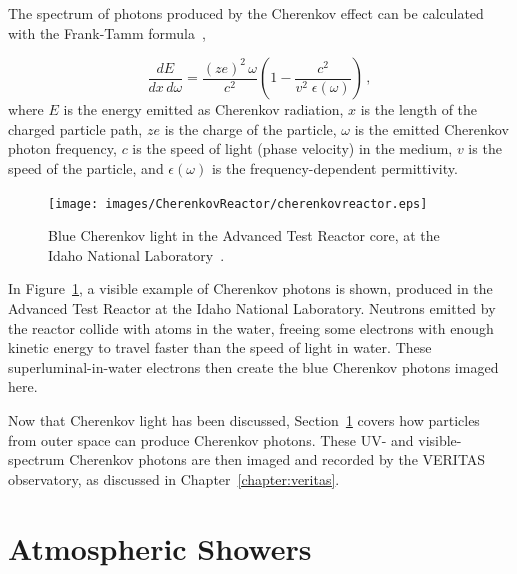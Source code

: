   The spectrum of photons produced by the Cherenkov effect can be calculated with the Frank-Tamm formula~\cite{franktamm1,franktamm2},
  
  \begin{equation}\label{eqn:franktamm}
    \frac{dE}{dx\,d\omega}=\frac{(ze)^2 \, \omega}{c^2} \left ( 1 - \frac{c^2}{v^2 \;\epsilon(\omega)} \right ) \,,
  \end{equation}
  where $E$ is the energy emitted as Cherenkov radiation, $x$ is the length of the charged particle path, $ze$ is the charge of the particle, $\omega$ is the emitted Cherenkov photon frequency, $c$ is the speed of light (phase velocity) in the medium, $v$ is the speed of the particle, and $\epsilon(\omega)$ is the frequency-dependent permittivity.
  
  \begin{figure}[!t]
    \centering
    \texttt{[image: images/CherenkovReactor/cherenkovreactor.eps]}
    \caption[Cherenkov Light from a Reactor]{
      Blue Cherenkov light in the Advanced Test Reactor core, at the Idaho National Laboratory~\cite{cherenkovreactor,atrlab}.
    }
    \label{fig:cherenkovreactor}
  \end{figure}
  
  In Figure~\ref{fig:cherenkovreactor}, a visible example of Cherenkov photons is shown, produced in the Advanced Test Reactor at the Idaho National Laboratory.
  Neutrons emitted by the reactor collide with atoms in the water, freeing some electrons with enough kinetic energy to travel faster than the speed of light in water.
  These superluminal-in-water electrons then create the blue Cherenkov photons imaged here.
  
  Now that Cherenkov light has been discussed, Section~\ref{sec:atmoshowers} covers how particles from outer space can produce Cherenkov photons.
  These UV- and visible-spectrum Cherenkov photons are then imaged and recorded by the VERITAS observatory, as discussed in Chapter~\ref{chapter:veritas}.
  
    
\section{Atmospheric Showers}\label{sec:atmoshowers}

